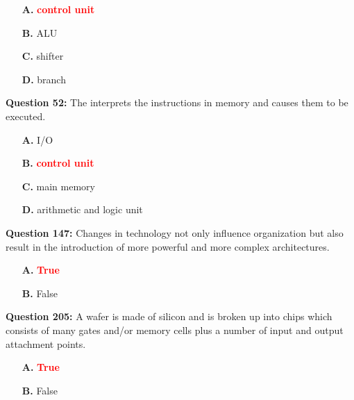 \documentclass[12pt,a4paper]{article}
\begin{document}
\begin{itemize}
    \item[\textbf{A.}] \textcolor{red}{\textbf{control unit}}
    \item[\textbf{B.}] ALU
    \item[\textbf{C.}] shifter
    \item[\textbf{D.}] branch
\end{itemize}

\vspace{0.5cm}

\vspace{0.5cm}

\textbf{Question 52:} The \underline{\hspace{1.5cm}} interprets the instructions in memory and causes them to be executed.

\begin{itemize}
    \item[\textbf{A.}] I/O
    \item[\textbf{B.}] \textcolor{red}{\textbf{control unit}}
    \item[\textbf{C.}] main memory
    \item[\textbf{D.}] arithmetic and logic unit
\end{itemize}

\vspace{0.5cm}

\vspace{0.5cm}

\textbf{Question 147:} Changes in technology not only influence organization but also result in the introduction of more powerful and more complex architectures.

\begin{itemize}
    \item[\textbf{A.}] \textcolor{red}{\textbf{True}}
    \item[\textbf{B.}] False
\end{itemize}

\vspace{0.5cm}

\vspace{0.5cm}

\textbf{Question 205:} A wafer is made of silicon and is broken up into chips which consists of many gates and/or memory cells plus a number of input and output attachment points.

\begin{itemize}
    \item[\textbf{A.}] \textcolor{red}{\textbf{True}}
    \item[\textbf{B.}] False
\end{itemize}
\end{document}
